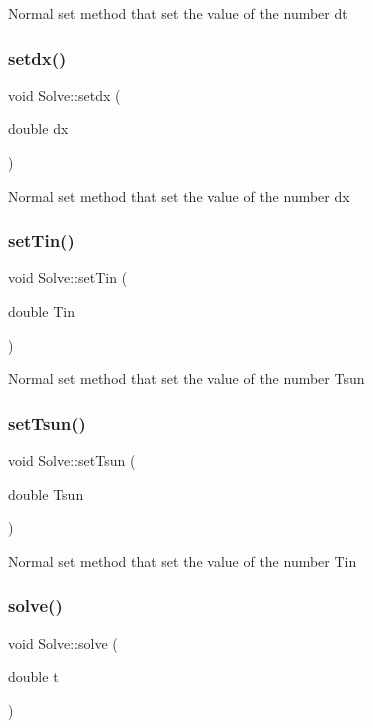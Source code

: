 Normal set method that set the value of the number dt \mbox{\label{class_solve_a60a27ba683584477189dc9c260c75127}} 
\subsubsection{\texorpdfstring{setdx()}{setdx()}}
{\footnotesize\ttfamily void Solve\+::setdx (\begin{DoxyParamCaption}\item[{double}]{dx }\end{DoxyParamCaption})}

Normal set method that set the value of the number dx \mbox{\label{class_solve_acef277ebf827a664b4378285a1fbeca3}} 
\subsubsection{\texorpdfstring{set\+Tin()}{setTin()}}
{\footnotesize\ttfamily void Solve\+::set\+Tin (\begin{DoxyParamCaption}\item[{double}]{Tin }\end{DoxyParamCaption})}

Normal set method that set the value of the number Tsun \mbox{\label{class_solve_a2088840c7117930845bc61444cbba285}} 
\subsubsection{\texorpdfstring{set\+Tsun()}{setTsun()}}
{\footnotesize\ttfamily void Solve\+::set\+Tsun (\begin{DoxyParamCaption}\item[{double}]{Tsun }\end{DoxyParamCaption})}

Normal set method that set the value of the number Tin \mbox{\label{class_solve_a1a56722993fdabea9928637d7dd8a2c7}} 
\subsubsection{\texorpdfstring{solve()}{solve()}}
{\footnotesize\ttfamily void Solve\+::solve (\begin{DoxyParamCaption}\item[{double}]{t }\end{DoxyParamCaption})\hspace{0.3cm}{\ttfamily [virtual]}}

